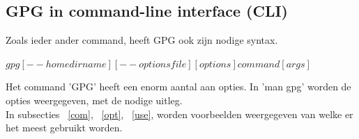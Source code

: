 \documentclass[12pt]{article}
\begin{document}
			\subsection{GPG in command-line interface (CLI)}\label{CLI}
				Zoals ieder ander command, heeft GPG ook zijn nodige syntax.\\
				\begin{center}
					$gpg  [--homedir name]  [--options file]  [options]  command  [args]$\\
				\end{center}
				Het command 'GPG' heeft een enorm aantal aan opties. In 'man gpg' worden de 							opties weergegeven, met de nodige uitleg.\\
				In subsecties ~\ref{com}, ~\ref{opt}, ~\ref{use}, worden voorbeelden weergegeven van 					welke er het meest gebruikt worden.\\
				
				\newpage
\end{document}
